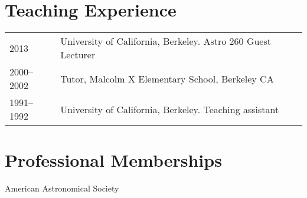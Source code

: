 \documentclass[line, margin]{res}
\begin{document}
\begin{resume}
\section{Teaching Experience}
\begin{tabular}{lp{4.4in}}
2013 & University of California, Berkeley. Astro 260 Guest Lecturer\\
2000--2002 & Tutor, Malcolm X Elementary School, Berkeley CA\\
1991--1992 & University of California, Berkeley. Teaching assistant\\
\end{tabular}

\section{Professional Memberships}
American Astronomical Society


\end{resume}
\end{document}
